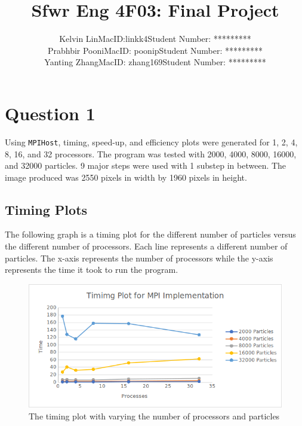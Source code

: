 \documentclass{article}
\begin{document}
\title{Sfwr Eng 4F03: Final Project}

\author{Kelvin Lin\hspace{10mm}MacID:linkk4\hspace{10mm}Student Number: *********\\Prabhbir Pooni\hspace{10mm}MacID: poonip\hspace{10mm}Student Number: *********\\Yanting Zhang\hspace{10mm}MacID: zhang169\hspace{10mm}Student Number: *********}

\maketitle

\section{Question 1}
Using \texttt{MPIHost}, timing, speed-up, and efficiency plots were generated for 1, 2, 4, 8, 16, and 32 processors. The program was tested with 2000, 4000, 8000, 16000, and 32000 particles. 9 major steps were used with 1 substep in between. The image produced was 2550 pixels in width by 1960 pixels in height.

\subsection{Timing Plots}
The following graph is a timing plot for the different number of particles versus the different number of processors. Each line represents a different number of particles. The x-axis represents the number of processors while the y-axis represents the time it took to run the program.

\begin{figure}[H]
	\begin{center}
		\hspace*{-0.5cm}                                                           
  		\includegraphics[scale=0.83]{Report_Assets/timingmpi.png}
  	\end{center}
  	\caption{The timing plot with varying the number of processors and particles}
\end{figure}
\end{document}
